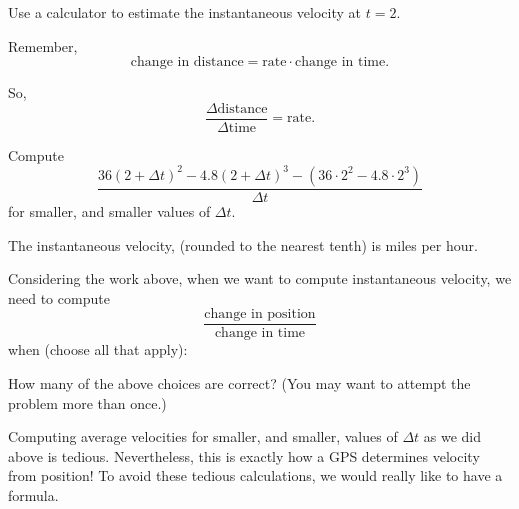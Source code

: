 \documentclass{ximera}
\begin{document}
\begin{problem}
  Use a calculator to estimate the instantaneous velocity at $t=2$.
  \begin{hint}
    Remember, 
    \[
    \text{change in distance} = \text{rate}\cdot\text{change in time}.
    \]
  \end{hint}
  \begin{hint}
    So, 
    \[
    \frac{\Delta\text{distance}}{\Delta\text{time}} = \text{rate}.
    \]
  \end{hint}
  \begin{hint}
    Compute
    \[
    \frac{36(2+\Delta t)^2 -4.8(2+\Delta t)^3 -\left(36\cdot 2^2 -4.8\cdot 2^3\right) }{\Delta t}
    \]
    for smaller, and smaller values of $\Delta t$.
  \end{hint}
  \begin{prompt}
    The instantaneous velocity, (rounded to the nearest tenth) is  miles per hour.
  \end{prompt}
\end{problem}


\begin{problem}
  Considering the work above, when we want to compute instantaneous
  velocity, we need to compute
  \[
  \frac{\text{change in position}}{\text{change in time}}
  \]
  when (choose all that apply):
 \begin{multipleChoice}
 \end{multipleChoice}
 
 \begin{problem}
 	How many of the above choices are correct?  (You may want to attempt the problem more than once.)
 \end{problem}
\end{problem}


Computing average velocities for smaller, and smaller, values of
$\Delta t$ as we did above is tedious. Nevertheless, this is exactly
how a GPS determines velocity from position! To avoid these tedious
calculations, we would really like to have a formula.





\end{document}
